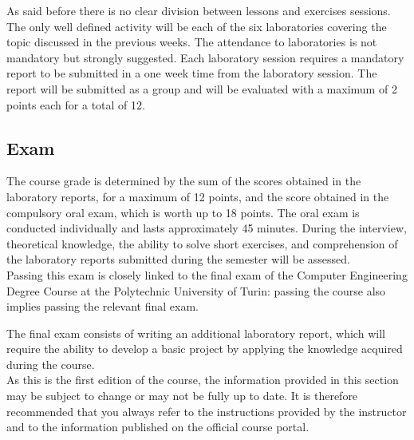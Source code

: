 \documentclass[../main.tex]{subfiles}
\begin{document}
As said before there is no clear division between lessons and exercises sessions. The only well defined activity will be each of the six laboratories covering the topic discussed in the previous weeks.
The attendance to laboratories is not mandatory but strongly suggested. Each laboratory session requires a mandatory report to be submitted in a one week time from the laboratory session. The report will be submitted as a group and will be evaluated with a maximum of 2 points each for a total of 12.

\subsection{Exam}

The course grade is determined by the sum of the scores obtained in the laboratory reports, for a maximum of 12 points, and the score obtained in the compulsory oral exam, which is worth up to 18 points.
The oral exam is conducted individually and lasts approximately 45 minutes. During the interview, theoretical knowledge, the ability to solve short exercises, and comprehension of the laboratory reports submitted during the semester will be assessed.\\

Passing this exam is closely linked to the final exam of the Computer Engineering Degree Course at the Polytechnic University of Turin: passing the course also implies passing the relevant final exam.

The final exam consists of writing an additional laboratory report, which will require the ability to develop a basic project by applying the knowledge acquired during the course.\\

As this is the first edition of the course, the information provided in this section may be subject to change or may not be fully up to date. It is therefore recommended that you always refer to the instructions provided by the instructor and to the information published on the official course portal.
\end{document}
